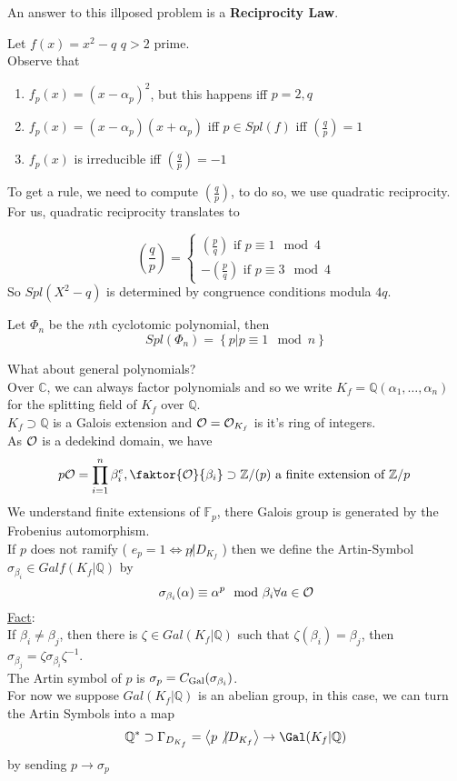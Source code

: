 \documentclass[../main.tex]{subfiles}
\begin{document}
An answer to this illposed problem is a \textbf{Reciprocity Law}.
\begin{exemple}
Let $f( x) = x^{2}-q$ $q>2 $ prime.\\
Observe that
\begin{enumerate}
\item $f_p( x) = ( x-\alpha_p)^{2}$, but this happens iff $p=2,q$ 
\item $f_p( x) = ( x-\alpha_p) ( x+\alpha_p) $ iff $p\in Spl( f) $ iff $( \frac{q}{p}) =1$
\item $f_p( x) $ is irreducible iff $( \frac{q}{p}) =-1$ 
\end{enumerate}
\end{exemple}
To get a rule, we need to compute $\left( \frac{q}{p}\right)$, to do so, we use quadratic reciprocity.
For us, quadratic reciprocity translates to
\begin{crly}
\[ 
	( \frac{q}{p}) =
	\begin{cases}
		( \frac{p}{q})  \text{ if } p \equiv 1 \mod 4\\
-( \frac{p}{q}) \text{ if } p \equiv 3 \mod 4
	\end{cases}
\]
So $Spl( X^{2}-q) $ is determined by congruence conditions modula $4q$.
\end{crly}
\begin{exemple}
Let $\Phi_n$ be the $n$th cyclotomic polynomial, then
\[ 
Spl( \Phi_n) = \left\{ p | p \equiv 1 \mod n \right\} 
\]
\end{exemple}
What about general polynomials?\\
Over $\mathbb{C}$, we can always factor polynomials and so we write $K_f= \mathbb{Q}( \alpha_1,\ldots,\alpha_n) $ for the splitting field of $K_f$ over $ \mathbb{Q}$.\\
$K_f \supset \mathbb{Q}$ is a Galois extension and $\mathcal{O} = \mathcal{O}_{K_f} $ is it's ring of integers.\\
As $\mathcal{O}$ is a dedekind domain, we have
\[ 
p\O = \prod_{i=1} ^{n} \beta_i^{e}, \faktor{\O}{\beta_i} \supset \mathbb{Z}/( p) \text{ a finite extension of $ \mathbb{Z}/p$  } 
\]
We understand finite extensions of $ \mathbb{F}_p$, there Galois group is generated by the Frobenius automorphism.\\
If $p$ does not ramify ( $e_p=1 \iff p\not| D_{K_f} $ ) then we define the Artin-Symbol $\sigma_{\beta_i} \in Galf( K_f | \mathbb{Q}) $ by 
\[ 
\sigma_{\beta_i} ( \alpha) \equiv \alpha ^{p}\mod \beta_i \forall a \in \mathcal{O}
\]
\underline{Fact}:\\
If $\beta_i \neq \beta_j$, then there is $\zeta \in Gal( K_f| \mathbb{Q}) $ such that $\zeta( \beta_i) = \beta_j$, then $\sigma_{\beta_j} = \zeta \sigma_{\beta_i} \zeta^{-1}$.\\
The Artin symbol of $p$ is $\sigma_p = C_{\operatorname{Gal}} ( \sigma_{\beta_i} ) $.\\
For now we suppose $Gal( K_f| \mathbb{Q}) $ is an abelian group, in this case, we can turn the Artin Symbols into a map
\[ 
	\mathbb{Q}^{*}\supset \Gamma_{D_{K_f}} = \eng{ p \not| D_{K_f} } \to \Gal( K_f| \mathbb{Q}) 
\]
by sending $p \to \sigma_p$ 
\end{document}
